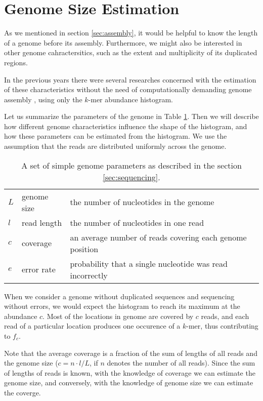 \section{Genome Size Estimation}
\label{sec:intro-estimation}
As we mentioned in section \ref{sec:assembly}, it would be helpful to know the length of a genome 
before its assembly. Furthermore, we might also be interested in other genome cahractersitics,
such as the extent and multiplicity of its duplicated regions.

In the previous years there were several researches concerned with the estimation 
of these characteristics without the need of computationally demanding 
genome assembly \cite{Hozza2015, Williams2013, Melsted2014, Sivadasan2016}, using only the $k$-mer 
abundance histogram.

\medskip

Let us summarize the parameters of the genome in Table \ref{tab:genome-parameters}.
Then we will describe how different genome characteristics influence the shape of the histogram,
and how these parameters can be estimated from the histogram. We use the assumption that
the reads are distributed uniformly across the genome. 

\begin{table}[h!]
\centering
\begin{tabular}{ l l l }
 $L$ & genome size & the number of nucleotides in the genome \\  
 $l$ & read length & the number of nucleotides in one read \\
 $c$ & coverage & an average number of reads covering each genome position \\ 
 $e$ & error rate & probability that a single nucleotide was read incorrectly   
\end{tabular}
\caption{A set of simple genome parameters as described in the section \ref{sec:sequencing}.
\label{tab:genome-parameters}}
\end{table}

When we consider a genome without duplicated sequences and sequencing without errors, we
would expect the histogram to reach its maximum at the abundance $c$. 
Most of the locations in genome are covered by $c$ reads, and each read of a particular
location produces one occurence of a $k$-mer, thus contributing to $f_c$.

Note that the average coverage is a fraction of the sum of lengths of all reads
and the genome size ($c = n \cdot l/L$, if $n$ denotes the number of all reads). 
Since the sum of lengths of reads is known, with the knowledge of coverage we can estimate the 
genome size, and conversely, with the knowledge of genome size we can estimate the coverge.


